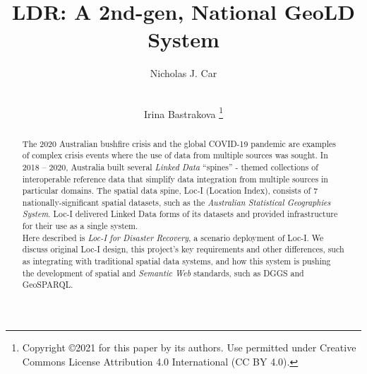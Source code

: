 \documentclass[runningheads]{llncs}
\begin{document}
\title{LDR: A 2nd-gen, National GeoLD System}

\author{
    Nicholas J. Car \and \\
    Irina Bastrakova
    \thanks{Copyright ©2021 for this paper by its authors. Use permitted under Creative Commons License Attribution 4.0 International (CC BY 4.0).}
}



\maketitle

\begin{abstract} 
The 2020 Australian bushfire crisis and the global COVID-19 pandemic are examples of complex crisis events where the use of data from multiple sources was sought. In 2018 – 2020, Australia built several \textit{Linked Data} ``spines'' - themed collections of interoperable reference data that simplify data 
integration from multiple sources in particular domains. 
The spatial data spine, Loc-I (Location Index), consists of 7 nationally-significant spatial datasets, such as the \textit{Australian Statistical Geographies System}. 
Loc-I delivered Linked Data forms of its datasets and provided infrastructure for their use as a single system.\\

Here described is \textit{Loc-I for Disaster Recovery}, a scenario deployment of Loc-I.
We discuss original Loc-I design, this project's key requirements and other differences, such as integrating with traditional
spatial data systems, and how this system is pushing the development of spatial and \textit{Semantic Web} standards, such as DGGS and GeoSPARQL.

\end{abstract}
\end{document}
